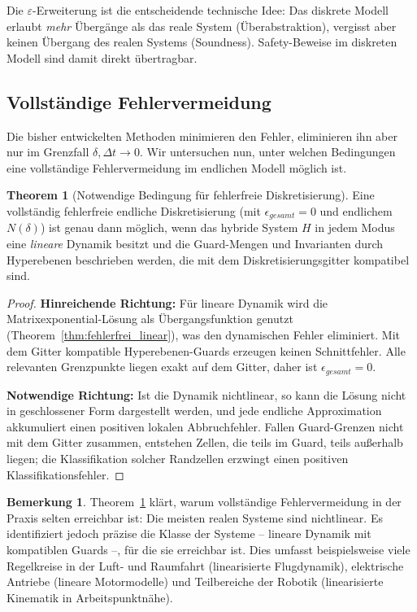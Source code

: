 ﻿\documentclass[a4paper,12pt]{article}
\theoremstyle{definition}
\newtheorem{theorem}{Theorem}[section]
\newtheorem{remark}{Bemerkung}[section]
\begin{document}
Die $\varepsilon$-Erweiterung ist die entscheidende technische Idee: Das diskrete Modell erlaubt \emph{mehr} Übergänge als das reale System (Überabstraktion), vergisst aber keinen Übergang des realen Systems (Soundness). Safety-Beweise im diskreten Modell sind damit direkt übertragbar.

\subsection{Vollständige Fehlervermeidung}

Die bisher entwickelten Methoden minimieren den Fehler, eliminieren ihn aber nur im Grenzfall $\delta, \Delta t \to 0$. Wir untersuchen nun, unter welchen Bedingungen eine vollständige Fehlervermeidung im endlichen Modell möglich ist.

\begin{theorem}[Notwendige Bedingung für fehlerfreie Diskretisierung]
\label{thm:notwendig}
Eine vollständig fehlerfreie endliche Diskretisierung (mit $\epsilon_{\mathit{gesamt}} = 0$ und endlichem $N(\delta)$) ist genau dann möglich, wenn das hybride System $H$ in jedem Modus eine \emph{lineare} Dynamik besitzt und die Guard-Mengen und Invarianten durch Hyperebenen beschrieben werden, die mit dem Diskretisierungsgitter kompatibel sind.
\end{theorem}

\begin{proof}
\textbf{Hinreichende Richtung:} Für lineare Dynamik wird die Matrixexponential-Lösung als Übergangsfunktion genutzt (Theorem~\ref{thm:fehlerfrei_linear}), was den dynamischen Fehler eliminiert. Mit dem Gitter kompatible Hyperebenen-Guards erzeugen keinen Schnittfehler. Alle relevanten Grenzpunkte liegen exakt auf dem Gitter, daher ist $\epsilon_{\mathit{gesamt}} = 0$.

\textbf{Notwendige Richtung:} Ist die Dynamik nichtlinear, so kann die Lösung nicht in geschlossener Form dargestellt werden, und jede endliche Approximation akkumuliert einen positiven lokalen Abbruchfehler. Fallen Guard-Grenzen nicht mit dem Gitter zusammen, entstehen Zellen, die teils im Guard, teils außerhalb liegen; die Klassifikation solcher Randzellen erzwingt einen positiven Klassifikationsfehler.
\end{proof}

\begin{remark}
Theorem~\ref{thm:notwendig} klärt, warum vollständige Fehlervermeidung in der Praxis selten erreichbar ist: Die meisten realen Systeme sind nichtlinear. Es identifiziert jedoch präzise die Klasse der Systeme -- lineare Dynamik mit kompatiblen Guards --, für die sie erreichbar ist. Dies umfasst beispielsweise viele Regelkreise in der Luft- und Raumfahrt (linearisierte Flugdynamik), elektrische Antriebe (lineare Motormodelle) und Teilbereiche der Robotik (linearisierte Kinematik in Arbeitspunktnähe).
\end{remark}
\end{document}
